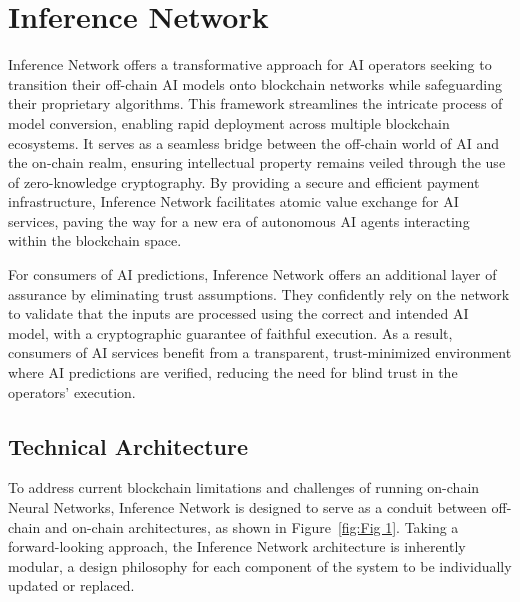 \documentclass[conference]{IEEEtran}
\begin{document}
\section{Inference Network}

Inference Network offers a transformative approach for AI operators seeking to transition their off-chain AI models onto blockchain networks while safeguarding their proprietary algorithms. This framework streamlines the intricate process of model conversion, enabling rapid deployment across multiple blockchain ecosystems. It serves as a seamless bridge between the off-chain world of AI and the on-chain realm, ensuring intellectual property remains veiled through the use of zero-knowledge cryptography. By providing a secure and efficient payment infrastructure, Inference Network facilitates atomic value exchange for AI services, paving the way for a new era of autonomous AI agents interacting within the blockchain space.

For consumers of AI predictions, Inference Network offers an additional layer of assurance by eliminating trust assumptions. They confidently rely on the network to validate that the inputs are processed using the correct and intended AI model, with a cryptographic guarantee of faithful execution.  As a result, consumers of AI services benefit from a transparent, trust-minimized environment where AI predictions are verified, reducing the need for blind trust in the operators' execution.

\subsection{Technical Architecture}

To address current blockchain limitations and challenges of running on-chain Neural Networks, Inference Network is designed to serve as a conduit between off-chain and on-chain architectures, as shown in Figure~\ref{fig:Fig 1}. Taking a forward-looking approach, the Inference Network architecture is inherently modular, a design philosophy for each component of the system to be individually updated or replaced.
\end{document}
